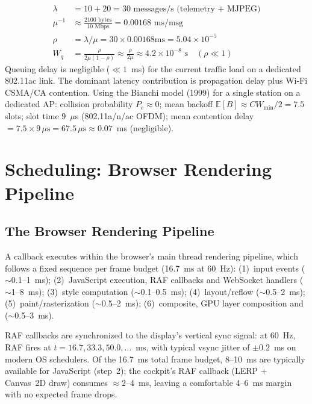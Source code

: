 \begin{eqblock}
\begin{align}
\lambda &= 10 + 20 = 30 \text{ messages/s (telemetry + MJPEG)} \\
\mu^{-1} &\approx \frac{2100 \text{ bytes}}{10 \text{ Mbps}} = 0.00168 \text{ ms/msg} \\
\rho &= \lambda/\mu = 30 \times 0.00168\text{ms} = 5.04\times10^{-5} \\
W_q &= \frac{\rho}{2\mu(1-\rho)} \approx \frac{\rho}{2\mu} \approx 4.2\times10^{-8}\text{ s} \quad (\rho \ll 1)
\end{align}
Queuing delay is negligible ($\ll1$~ms) for the current traffic load on a dedicated 802.11ac link. The dominant latency contribution is propagation delay plus Wi-Fi CSMA/CA contention. Using the Bianchi model (1999) for a single station on a dedicated AP: collision probability $P_c\approx0$; mean backoff $\mathbb{E}[B]\approx CW_{\min}/2 = 7.5$ slots; slot time 9~$\mu$s (802.11a/n/ac OFDM); mean contention delay $=7.5\times9\,\mu\text{s}=67.5\,\mu\text{s}\approx0.07$~ms (negligible).
\end{eqblock}

\section{\texorpdfstring{}{requestAnimationFrame} Scheduling: Browser Rendering Pipeline}

\subsection{The Browser Rendering Pipeline}

A  callback executes within the browser's main thread rendering pipeline, which follows a fixed sequence per frame budget (16.7~ms at 60~Hz): (1)~input events ($\sim$0.1--1~ms); (2)~JavaScript execution, RAF callbacks and WebSocket handlers ($\sim$1--8~ms); (3)~style computation ($\sim$0.1--0.5~ms); (4)~layout/reflow ($\sim$0.5--2~ms); (5)~paint/rasterization ($\sim$0.5--2~ms); (6)~composite, GPU layer composition and  ($\sim$0.5--3~ms).

RAF callbacks are synchronized to the display's vertical sync signal: at 60~Hz, RAF fires at $t=16.7, 33.3, 50.0,\dots$~ms, with typical vsync jitter of $\pm0.2$~ms on modern OS schedulers. Of the 16.7~ms total frame budget, 8--10~ms are typically available for JavaScript (step~2); the cockpit's RAF callback (LERP + Canvas~2D draw) consumes $\approx$2--4~ms, leaving a comfortable 4--6~ms margin with no expected frame drops.

